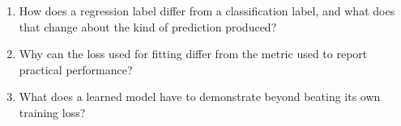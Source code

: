 \begin{quickcheck}
\begin{enumerate}
  \item How does a regression label differ from a classification label, and what does that change about the kind of prediction produced?
  \item Why can the loss used for fitting differ from the metric used to report practical performance?
  \item What does a learned model have to demonstrate beyond beating its own training loss?
\end{enumerate}
\end{quickcheck}
